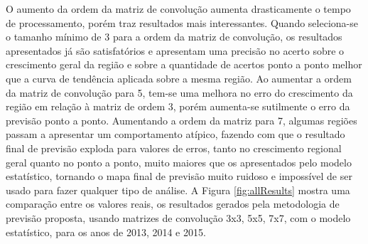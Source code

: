 O aumento da ordem da matriz de convolução aumenta drasticamente o tempo de processamento, porém traz resultados mais interessantes. Quando seleciona-se o tamanho mínimo de 3 para a ordem da matriz de convolução, os resultados apresentados já são satisfatórios e apresentam uma precisão no acerto sobre o crescimento geral da região e sobre a quantidade de acertos ponto a ponto melhor que a curva de tendência aplicada sobre a mesma região. Ao aumentar a ordem da matriz de convolução para 5, tem-se uma melhora no erro do crescimento da região em relação à matriz de ordem 3, porém aumenta-se sutilmente o erro da previsão ponto a ponto. Aumentando a ordem da matriz para 7, algumas regiões passam a apresentar um comportamento atípico, fazendo com que o resultado final de previsão exploda para valores de erros, tanto no crescimento regional geral quanto no ponto a ponto, muito maiores que os apresentados pelo modelo estatístico, tornando o mapa final de previsão muito ruidoso e impossível de ser usado para fazer qualquer tipo de análise. A Figura \ref{fig:allResults} mostra uma comparação entre os valores reais, os resultados gerados pela metodologia de previsão proposta, usando matrizes de convolução 3x3, 5x5, 7x7, com o modelo estatístico, para os anos de 2013, 2014 e 2015.

